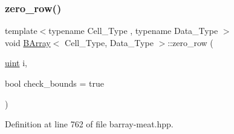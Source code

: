 \subsubsection{\texorpdfstring{zero\+\_\+row()}{zero\_row()}}
{\footnotesize\ttfamily template$<$typename Cell\+\_\+\+Type , typename Data\+\_\+\+Type $>$ \\
void \hyperlink{class_b_array}{B\+Array}$<$ Cell\+\_\+\+Type, Data\+\_\+\+Type $>$\+::zero\+\_\+row (\begin{DoxyParamCaption}\item[{\hyperlink{typedefs_8hpp_a91ad9478d81a7aaf2593e8d9c3d06a14}{uint}}]{i,  }\item[{bool}]{check\+\_\+bounds = {\ttfamily true} }\end{DoxyParamCaption})\hspace{0.3cm}{\ttfamily [inline]}}



Definition at line 762 of file barray-\/meat.\+hpp.

